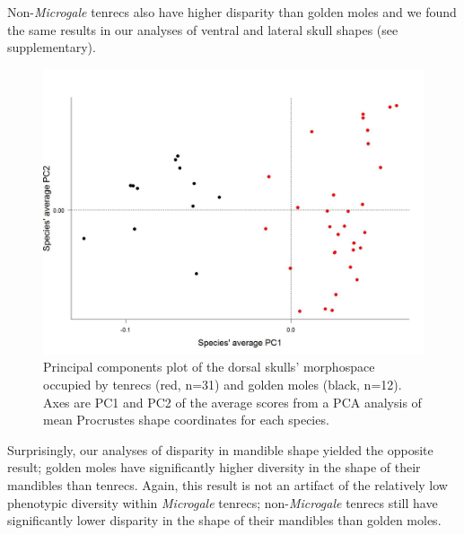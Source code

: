 \documentclass[12pt,a4paper]{article}
\begin{document}
Non-\textit{Microgale} tenrecs also have higher disparity than golden moles and we found the same results in our analyses of ventral and lateral skull shapes (see supplementary).




	
\begin{figure}[H]
\centering
\includegraphics[width=1\linewidth]{SkDors_Tenrecs+Gmoles_PC1PC2_01_05.jpg}
\caption{Principal components plot of the dorsal skulls' morphospace occupied by tenrecs (red, n=31) and golden moles (black, n=12). Axes are PC1 and PC2 of the average scores from a PCA analysis of mean Procrustes shape coordinates for each species. }
\label{skdorsPCA}
\end{figure}


Surprisingly, our analyses of disparity in mandible shape yielded the opposite result; golden moles have significantly higher diversity in the shape of their mandibles than tenrecs.  
Again, this result is not an artifact of the relatively low phenotypic diversity within \textit{Microgale} tenrecs; non-\textit{Microgale} tenrecs still have significantly lower disparity in the shape of their mandibles than golden moles.
\end{document}
